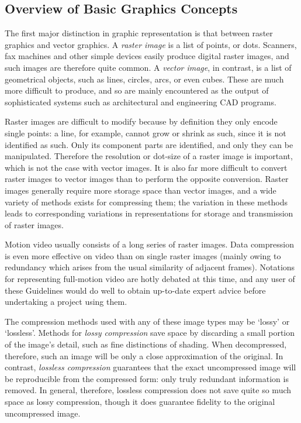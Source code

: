 \subsection[{Overview of Basic Graphics Concepts}]{Overview of Basic Graphics Concepts}\label{FTGROV}\par
The first major distinction in graphic representation is that between raster graphics and vector graphics. A \textit{raster image} is a list of points, or dots. Scanners, fax machines and other simple devices easily produce digital raster images, and such images are therefore quite common. A \textit{vector image}, in contrast, is a list of geometrical objects, such as lines, circles, arcs, or even cubes. These are much more difficult to produce, and so are mainly encountered as the output of sophisticated systems such as architectural and engineering CAD programs.\par
Raster images are difficult to modify because by definition they only encode single points: a line, for example, cannot grow or shrink as such, since it is not identified as such. Only its component parts are identified, and only they can be manipulated. Therefore the resolution or dot-size of a raster image is important, which is not the case with vector images. It is also far more difficult to convert raster images to vector images than to perform the opposite conversion. Raster images generally require more storage space than vector images, and a wide variety of methods exists for compressing them; the variation in these methods leads to corresponding variations in representations for storage and transmission of raster images.\par
Motion video usually consists of a long series of raster images. Data compression is even more effective on video than on single raster images (mainly owing to redundancy which arises from the usual similarity of adjacent frames). Notations for representing full-motion video are hotly debated at this time, and any user of these Guidelines would do well to obtain up-to-date expert advice before undertaking a project using them.\par
The compression methods used with any of these image types may be ‘lossy’ or ‘lossless’. Methods for \textit{lossy compression} save space by discarding a small portion of the image's detail, such as fine distinctions of shading. When decompressed, therefore, such an image will be only a close approximation of the original. In contrast, \textit{lossless compression} guarantees that the exact uncompressed image will be reproducible from the compressed form: only truly redundant information is removed. In general, therefore, lossless compression does not save quite so much space as lossy compression, though it does guarantee fidelity to the original uncompressed image.\par
